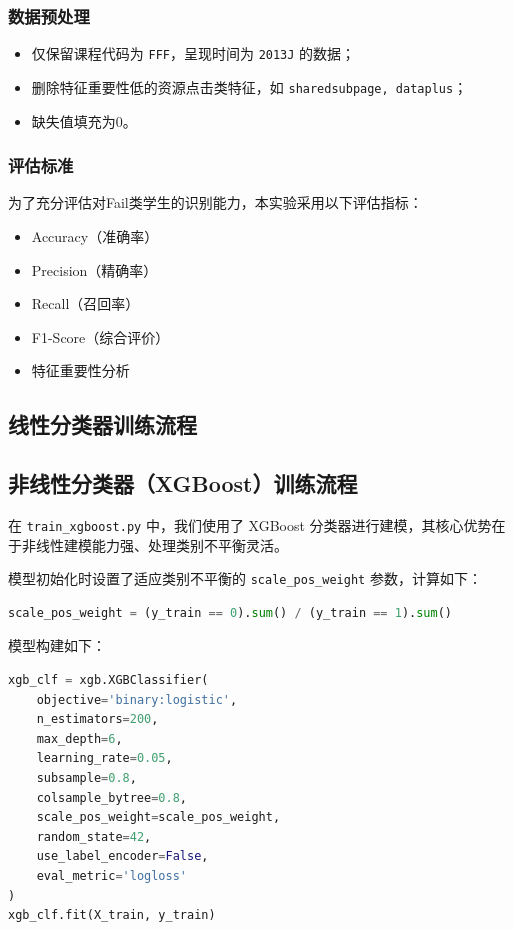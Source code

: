 \documentclass{SYSUReport}
\begin{document}
\subsubsection{数据预处理}
\begin{itemize}
    \item 仅保留课程代码为 \texttt{FFF}，呈现时间为 \texttt{2013J} 的数据；
    \item 删除特征重要性低的资源点击类特征，如 \texttt{sharedsubpage, dataplus}；
    \item 缺失值填充为0。
\end{itemize}

\subsubsection{评估标准}
为了充分评估对Fail类学生的识别能力，本实验采用以下评估指标：
\begin{itemize}
    \item Accuracy（准确率）
    \item Precision（精确率）
    \item Recall（召回率）
    \item F1-Score（综合评价）
    \item 特征重要性分析
\end{itemize}

\subsection{线性分类器训练流程}

\subsection{非线性分类器（XGBoost）训练流程}

在 \texttt{train\_xgboost.py} 中，我们使用了 XGBoost 分类器进行建模，其核心优势在于非线性建模能力强、处理类别不平衡灵活。

模型初始化时设置了适应类别不平衡的 \texttt{scale\_pos\_weight} 参数，计算如下：

\begin{lstlisting}[language=Python]
scale_pos_weight = (y_train == 0).sum() / (y_train == 1).sum()
\end{lstlisting}

模型构建如下：

\begin{lstlisting}[language=Python]
xgb_clf = xgb.XGBClassifier(
    objective='binary:logistic',
    n_estimators=200,
    max_depth=6,
    learning_rate=0.05,
    subsample=0.8,
    colsample_bytree=0.8,
    scale_pos_weight=scale_pos_weight,
    random_state=42,
    use_label_encoder=False,
    eval_metric='logloss'
)
xgb_clf.fit(X_train, y_train)
\end{lstlisting}
\end{document}
